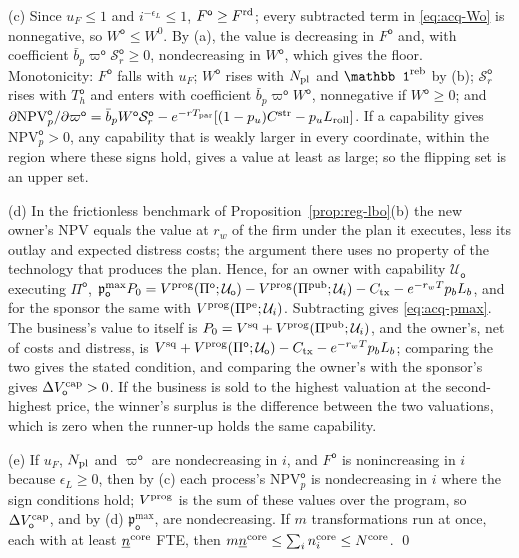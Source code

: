 (c) Since $u_F\le1$ and $i^{-\epsilon_L}\le1$, $F^{\mathsf o}\ge F^{\rm rd}$; every subtracted term in \eqref{eq:acq-Wo} is nonnegative, so $W^{\mathsf o}\le W^0$. By (a), the value is decreasing in $F^{\mathsf o}$ and, with coefficient $\bar b_p\varpi^{\mathsf o}\mathcal S^{\mathsf o}_r\ge0$, nondecreasing in $W^{\mathsf o}$, which gives the floor. Monotonicity: $F^{\mathsf o}$ falls with $u_F$; $W^{\mathsf o}$ rises with $N_{\rm pl}$ and $\mathbb 1^{\rm reb}$ by (b); $\mathcal S^{\mathsf o}_r$ rises with $T^{\mathsf o}_h$ and enters with coefficient $\bar b_p\varpi^{\mathsf o}W^{\mathsf o}$, nonnegative if $W^{\mathsf o}\ge0$; and $\partial\mathrm{NPV}^{\mathsf o}_p/\partial\varpi^{\mathsf o}=\bar b_pW^{\mathsf o}\mathcal S^{\mathsf o}_r-e^{-rT_{\rm par}}[(1-p_u)C^{\rm str}-p_uL_{\rm roll}]$. If a capability gives $\mathrm{NPV}^{\mathsf o}_p>0$, any capability that is weakly larger in every coordinate, within the region where these signs hold, gives a value at least as large; so the flipping set is an upper set.

(d) In the frictionless benchmark of Proposition~\ref{prop:reg-lbo}(b) the new owner's NPV equals the value at $r_w$ of the firm under the plan it executes, less its outlay and expected distress costs; the argument there uses no property of the technology that produces the plan. Hence, for an owner with capability $\mathcal U_{\mathsf o}$ executing $\Pi^{\mathsf o}$, $\mathfrak p^{\max}_{\mathsf o}P_0=V^{\rm prog}(\Pi^{\mathsf o};\mathcal U_{\mathsf o})-V^{\rm prog}(\Pi^{\rm pub};\mathcal U_i)-C_{\rm tx}-e^{-r_wT}p_bL_b$, and for the sponsor the same with $V^{\rm prog}(\Pi^{\rm pe};\mathcal U_i)$. Subtracting gives \eqref{eq:acq-pmax}. The business's value to itself is $P_0=V^{\rm sq}+V^{\rm prog}(\Pi^{\rm pub};\mathcal U_i)$, and the owner's, net of costs and distress, is $V^{\rm sq}+V^{\rm prog}(\Pi^{\mathsf o};\mathcal U_{\mathsf o})-C_{\rm tx}-e^{-r_wT}p_bL_b$; comparing the two gives the stated condition, and comparing the owner's with the sponsor's gives $\Delta V^{\rm cap}_{\mathsf o}>0$. If the business is sold to the highest valuation at the second-highest price, the winner's surplus is the difference between the two valuations, which is zero when the runner-up holds the same capability.

(e) If $u_F$, $N_{\rm pl}$ and $\varpi^{\mathsf o}$ are nondecreasing in $i$, and $F^{\mathsf o}$ is nonincreasing in $i$ because $\epsilon_L\ge0$, then by (c) each process's $\mathrm{NPV}^{\mathsf o}_p$ is nondecreasing in $i$ where the sign conditions hold; $V^{\rm prog}$ is the sum of these values over the program, so $\Delta V^{\rm cap}_{\mathsf o}$, and by (d) $\mathfrak p^{\max}_{\mathsf o}$, are nondecreasing. If $m$ transformations run at once, each with at least $\underline n^{\rm core}$ FTE, then $m\underline n^{\rm core}\le\sum_in^{\rm core}_i\le N^{\rm core}$. \qed

